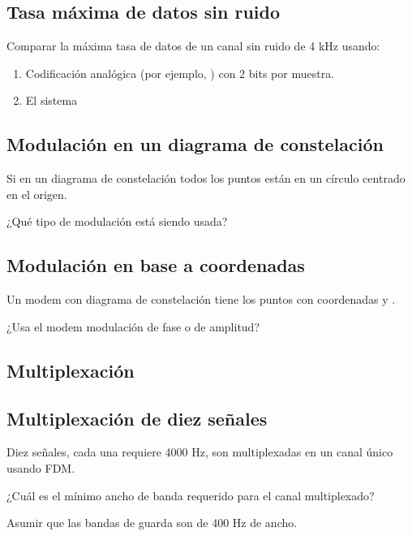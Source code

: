 \documentclass[12pt]{report}
\begin{document}
\begin{exer}
	\subsection{Tasa máxima de datos sin ruido \sthree}
	Comparar la máxima tasa de datos de un canal sin ruido de 4 kHz usando:

	\begin{enumerate}
		\item Codificación analógica (por ejemplo, ) con 2 bits por muestra.
		\item El sistema 
	\end{enumerate}
\end{exer}

\begin{exer}
	\subsection{Modulación en un diagrama de constelación \sthree \steo}
	Si en un diagrama de constelación todos los puntos están en un círculo centrado en el origen.

	¿Qué tipo de modulación está siendo usada?
\end{exer}

\begin{exer}
	\subsection{Modulación en base a coordenadas \stwo \steo}
	Un modem con diagrama de constelación tiene los puntos con coordenadas  y
	.

	¿Usa el modem modulación de fase o de amplitud?
\end{exer}

\begin{exer}
	\section{Multiplexación}
	\subsection{Multiplexación de diez señales \sthree}
	Diez señales, cada una requiere 4000 Hz, son multiplexadas en un canal único usando FDM.

	¿Cuál es el mínimo ancho de banda requerido para el canal multiplexado?

	Asumir que las bandas de guarda son de 400 Hz de ancho.
\end{exer}
\end{document}
